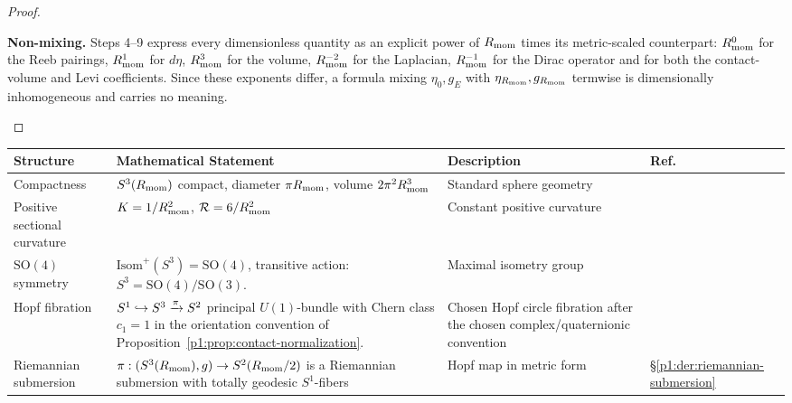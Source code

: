 \documentclass[11pt]{article}
\begin{document}
\begin{proof}
\begin{proofsteps}
\item \textbf{Non-mixing.}
Steps 4--9 express every dimensionless quantity as an explicit power of
\(R_{\mathrm{mom}}\) times its metric-scaled counterpart: \(R_{\mathrm{mom}}^0\) for the Reeb
pairings, \(R_{\mathrm{mom}}^{1}\) for \(d\eta\), \(R_{\mathrm{mom}}^{3}\) for the volume,
\(R_{\mathrm{mom}}^{-2}\) for the Laplacian, \(R_{\mathrm{mom}}^{-1}\) for the Dirac operator and for
both the contact-volume and Levi coefficients.  Since these exponents differ, a
formula mixing \(\eta_0,g_E\) with \(\eta_{R_{\mathrm{mom}}},g_{R_{\mathrm{mom}}}\) termwise is
dimensionally inhomogeneous and carries no meaning.
\end{proofsteps}
\end{proof}

\begin{table}[htbp]
\centering
\begingroup
\scriptsize
\setlength{\tabcolsep}{3pt}
\renewcommand{\arraystretch}{1.08}

\begin{tabular}{|
  L{3.0cm}|
  L{\dimexpr\linewidth-3.0cm-3.4cm-0.9cm-8\arrayrulewidth\relax}|
  L{3.4cm}|
  C{0.9cm}|
}
\hline
\textbf{Structure} & \textbf{Mathematical Statement} & \textbf{Description} & \textbf{Ref.} \\
\hline

Compactness
& $S^3(R_{\mathrm{mom}})$ compact, diameter $\pi R_{\mathrm{mom}}$, volume $2\pi^2 R_{\mathrm{mom}}^3$
& Standard sphere geometry
& \cite{do1992riemannian} \\
\hline

Positive sectional curvature
& $K = 1/R_{\mathrm{mom}}^{2}$, $\mathcal R = 6/R_{\mathrm{mom}}^{2}$
& Constant positive curvature
& \cite{do1992riemannian} \\
\hline

$\mathrm{SO}(4)$ symmetry
& $\mathrm{Isom}^+(S^3) = \mathrm{SO}(4)$, transitive action: $S^3 = \mathrm{SO}(4)/\mathrm{SO}(3)$.
& Maximal isometry group
& \cite{helgason1984groups} \\
\hline

Hopf fibration
& $S^1 \hookrightarrow S^3 \xrightarrow{\pi} S^2$ principal $U(1)$-bundle with Chern class $c_1=1$ in the orientation convention of Proposition~\ref{p1:prop:contact-normalization}.
& Chosen Hopf circle fibration after the chosen complex/quaternionic convention
& \cite{hopf1931abbildung} \\
\hline

Riemannian submersion
& \(\pi:(S^3(R_{\mathrm{mom}}),g)\to S^2(R_{\mathrm{mom}}/2)\) is a Riemannian submersion with totally geodesic \(S^1\)-fibers
& Hopf map in metric form
& \S\ref{p1:der:riemannian-submersion} \\
\hline


\end{tabular}
\end{table}
\end{document}
